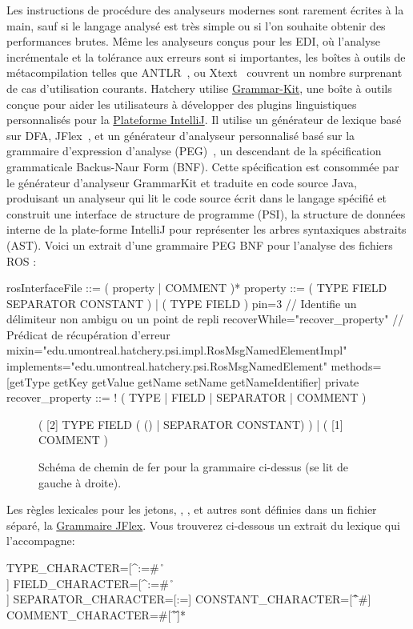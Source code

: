 Les instructions de procédure des analyseurs modernes sont rarement écrites à la main, sauf si le langage analysé est très simple ou si l'on souhaite obtenir des performances brutes. Même les analyseurs conçus pour les EDI, où l'analyse incrémentale et la tolérance aux erreurs sont si importantes, les boîtes à outils de métacompilation telles que ANTLR~\citep{parr1995antlr}, ou Xtext~\citep{eysholdt2010xtext} couvrent un nombre surprenant de cas d'utilisation courants. Hatchery utilise \href{https://github.com/JetBrains/grammar-kit}{Grammar-Kit}, une boîte à outils conçue pour aider les utilisateurs à développer des plugins linguistiques personnalisés pour la \href{https://www.jetbrains.org/intellij/sdk/docs}{Plateforme IntelliJ}. Il utilise un générateur de lexique basé sur DFA, JFlex~\citep{klein2001jflex}, et un générateur d'analyseur personnalisé basé sur la grammaire d'expression d'analyse (PEG)~\citep{ford2004parsing}, un descendant de la spécification grammaticale Backus-Naur Form (BNF). Cette spécification est consommée par le générateur d'analyseur GrammarKit et traduite en code source Java, produisant un analyseur qui lit le code source écrit dans le langage spécifié et construit une interface de structure de programme (PSI), la structure de données interne de la plate-forme IntelliJ pour représenter les arbres syntaxiques abstraits (AST). Voici un extrait d'une grammaire PEG BNF pour l'analyse des fichiers ROS \href{https://wiki.ros.org/msg}{}:
%
\begin{bnflisting}
rosInterfaceFile ::= ( property | COMMENT )*
property ::= ( TYPE FIELD SEPARATOR CONSTANT ) | ( TYPE FIELD ) {
    pin=3 // Identifie un délimiteur non ambigu ou un point de repli
    recoverWhile="recover_property" // Prédicat de récupération d'erreur
    mixin="edu.umontreal.hatchery.psi.impl.RosMsgNamedElementImpl"
    implements="edu.umontreal.hatchery.psi.RosMsgNamedElement"
    methods=[getType getKey getValue getName setName getNameIdentifier]
}
private recover_property ::= ! ( TYPE | FIELD | SEPARATOR | COMMENT )
\end{bnflisting}
%
\begin{figure}
\centering
\begin{rail}
( [2] TYPE FIELD ( () | SEPARATOR CONSTANT) ) | ( [1] COMMENT )
\end{rail}
\caption{Schéma de chemin de fer pour la grammaire ci-dessus (se lit de gauche à droite).}
\label{fig:railroad}
\end{figure}
%
Les règles lexicales pour les jetons, , ,  et autres sont définies dans un fichier  séparé, la \href{https://www.jflex.de/manual.html#Grammar}{Grammaire JFlex}. Vous trouverez ci-dessous un extrait du lexique  qui l'accompagne:
%
\begin{flexlisting}
TYPE_CHARACTER=[^:=#\ \r\n\t\f\\]
FIELD_CHARACTER=[^:=#\ \r\n\t\f\\]
SEPARATOR_CHARACTER=[:=]
CONSTANT_CHARACTER=[^\r\n\f#]
COMMENT_CHARACTER=#[^\r\n\f]*
\end{flexlisting}

